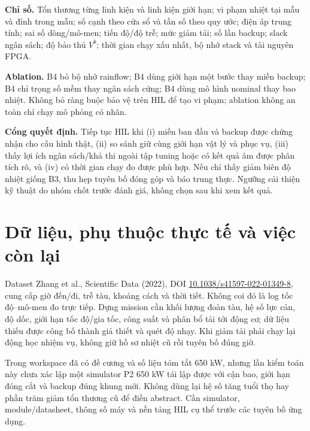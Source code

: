 \documentclass[11pt,a4paper]{article}
\begin{document}
\textbf{Chỉ số.} Tổn thương từng linh kiện và linh kiện giới hạn; vi phạm nhiệt tại mẫu và đỉnh trong mẫu; số cạnh theo cửa sổ và tần số theo quy ước; điện áp trung tính; sai số dòng/mô-men; tiến độ/độ trễ; mức giảm tải; số lần backup; slack ngân sách; độ bảo thủ $V^b$; thời gian chạy xấu nhất, bộ nhớ stack và tài nguyên FPGA.

\textbf{Ablation.} B4 bỏ bộ nhớ rainflow; B4 dùng giới hạn một bước thay miền backup; B4 chỉ trọng số mềm thay ngân sách cứng; B4 dùng mô hình nominal thay bao nhiệt. Không bỏ ràng buộc bảo vệ trên HIL để tạo vi phạm; ablation không an toàn chỉ chạy mô phỏng có nhãn.

\textbf{Cổng quyết định.} Tiếp tục HIL khi (i) miền ban đầu và backup được chứng nhận cho cấu hình thật, (ii) so sánh giữ cùng giới hạn vật lý và phục vụ, (iii) thấy lợi ích ngân sách/khả thi ngoài tập tuning hoặc có kết quả âm được phân tích rõ, và (iv) có thời gian chạy đo được phù hợp. Nếu chỉ thấy giảm biên độ nhiệt giống B3, thu hẹp tuyên bố đóng góp và báo trung thực. Ngưỡng cải thiện kỹ thuật do nhóm chốt trước đánh giá, không chọn sau khi xem kết quả.

\section{Dữ liệu, phụ thuộc thực tế và việc còn lại}
Dataset Zhang et al., Scientific Data (2022), DOI \href{https://doi.org/10.1038/s41597-022-01349-8}{10.1038/s41597-022-01349-8}, cung cấp giờ đến/đi, trễ tàu, khoảng cách và thời tiết. Không coi đó là log tốc độ--mô-men đo trực tiếp. Dựng mission cần khối lượng đoàn tàu, hệ số lực cản, độ dốc, giới hạn tốc độ/gia tốc, công suất và phân bổ tải tới động cơ; dữ liệu thiếu được công bố thành giả thiết và quét độ nhạy. Khi giảm tải phải chạy lại động học nhiệm vụ, không giữ hồ sơ nhiệt cũ rồi tuyên bố đúng giờ.

Trong workspace đã có đề cương và số liệu tóm tắt 650 kW, nhưng lần kiểm toán này chưa xác lập một simulator P2 650 kW tái lập được với cận bao, giới hạn đóng cắt và backup đúng khung mới. Không dùng lại hệ số tăng tuổi thọ hay phần trăm giảm tổn thương cũ để điền abstract. Cần simulator, module/datasheet, thông số máy và nền tảng HIL cụ thể trước các tuyên bố ứng dụng.
\end{document}
